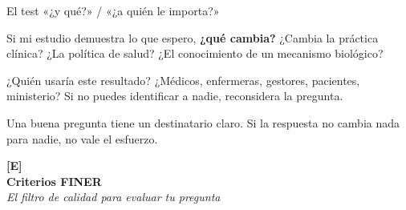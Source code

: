 \documentclass[12pt, aspectratio=169]{beamer}
\begin{document}

\begin{frame}{El test «¿y qué?» / «¿a quién le importa?»}
  \begin{examplebox}
    \small
    Si mi estudio demuestra lo que espero, \textbf{¿qué cambia?}
    ¿Cambia la práctica clínica? ¿La política de salud?
    ¿El conocimiento de un mecanismo biológico?
  \end{examplebox}

  \vspace{2pt}
  \begin{examplebox}
    \small
    ¿Quién usaría este resultado?
    ¿Médicos, enfermeras, gestores, pacientes, ministerio?
    Si no puedes identificar a nadie, reconsidera la pregunta.
  \end{examplebox}

  \vspace{2pt}
  \begin{keybox}
    \small
    Una buena pregunta tiene un destinatario claro.
    Si la respuesta no cambia nada para nadie, no vale el esfuerzo.
  \end{keybox}
\end{frame}

\begin{frame}[plain]
  \vfill
  \centering
  \begin{tcolorbox}[colback=sfPrimary, colframe=sfPrimary,
                    width=0.72\textwidth, arc=4pt, boxrule=0pt,
                    left=12pt, right=12pt, top=10pt, bottom=10pt]
    \centering
    \color{white}
    \large\textbf{[E]}\\[4pt]
    \Large\textbf{Criterios FINER}\\[8pt]
    \normalsize\textit{El filtro de calidad para evaluar tu pregunta}
  \end{tcolorbox}
  \vfill
\end{frame}

\end{document}
